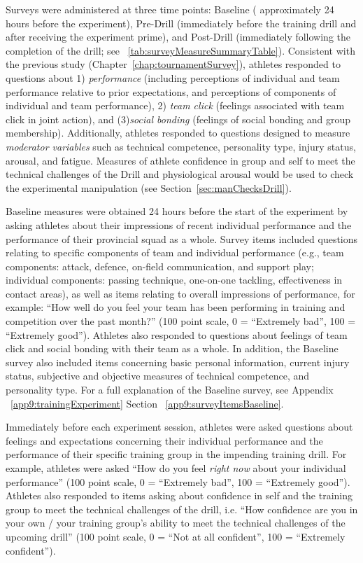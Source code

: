 Surveys were administered at three time points: Baseline ( approximately 24 hours before the experiment), Pre-Drill (immediately before the training drill and after receiving the experiment prime), and Post-Drill (immediately following the completion of the drill; see ~\ref{tab:surveyMeasureSummaryTable}). Consistent with the previous study (Chapter~\ref{chap:tournamentSurvey}), athletes responded to questions about 1) \textit{performance} (including perceptions of individual and team performance relative to prior expectations, and perceptions of components of individual and team performance), 2) \textit{team click} (feelings associated with team click in joint action), and (3)\textit{social bonding} (feelings of social bonding and group membership).  Additionally, athletes responded to questions designed to measure \textit{moderator variables} such as technical competence, personality type, injury status, arousal, and fatigue. Measures of athlete confidence in group and self to meet the technical challenges of the Drill and physiological arousal would be used to check the experimental manipulation (see Section~\ref{sec:manChecksDrill}).


    


Baseline measures were obtained 24 hours before the start of the experiment by asking athletes about their impressions of recent individual performance and the performance of their provincial squad as a whole.  Survey items included questions relating to specific components of team and individual performance (e.g., team components: attack, defence, on-field communication, and support play; individual components: passing technique, one-on-one tackling, effectiveness in contact areas), as well as items relating to overall impressions of performance, for example: ``How well do you feel your team has been performing in training and competition over the past month?'' (100 point scale, 0 = ``Extremely bad'', 100 = ``Extremely good'').  Athletes also responded to questions about feelings of team click and social bonding with their team as a whole.  In addition, the Baseline survey also included items concerning basic personal information, current injury status, subjective and objective measures of technical competence, and personality type.  For a full explanation of the Baseline survey, see Appendix ~\ref{app9:trainingExperiment} Section ~\ref{app9:surveyItemsBaseline}.


Immediately before each experiment session, athletes were asked questions about feelings and expectations concerning their individual performance and the performance of their specific training group in the impending training drill.  For example, athletes were asked ``How do you feel \textit{right now} about your individual performance'' (100 point scale, 0 = ``Extremely bad'', 100 = ``Extremely good'').  Athletes also responded to items asking about confidence in self and the training group to meet the technical challenges of the drill, i.e. ``How confidence are you in your own / your training group's ability to meet the technical challenges of the upcoming drill'' (100 point scale, 0 = ``Not at all confident'', 100 = ``Extremely confident'').

